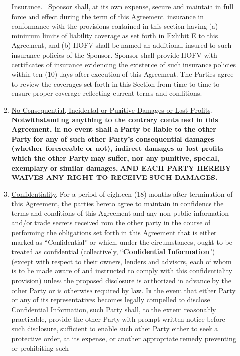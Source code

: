 \documentclass[]{article}
\begin{document}
\begin{enumerate}
\begin{enumerate}
    \uline{Insurance}.~ Sponsor shall, at its own expense, secure and
    maintain in full force and effect during the term of this
    Agreement~insurance in conformance with the provisions contained in
    this section having (a) minimum limits of liability coverage as set
    forth in \uline{Exhibit E} to this Agreement, and (b) HOFV shall be
    named an additional insured to such insurance policies of the
    Sponsor. Sponsor shall provide HOFV with certificates of insurance
    evidencing the existence of such insurance policies within ten (10)
    days after execution of this Agreement. The Parties agree to review
    the coverages set forth in this Section from time to time to ensure
    proper coverage reflecting current terms and conditions.
  \item
    \uline{No Consequential, Incidental or Punitive Damages or Lost
    Profits}. \textbf{Notwithstanding anything to the contrary contained
    in this Agreement, in no event shall a Party be liable to the other
    Party for any of such other Party's consequential damages (whether
    foreseeable or not), indirect damages or lost profits which the
    other Party may suffer, nor any punitive, special, exemplary or
    similar damages, AND EACH PARTY HEREBY WAIVES ANY RIGHT TO RECEIVE
    SUCH DAMAGES.}
  \item
    \uline{Confidentiality}. For a period of eighteen (18) months after
    termination of this Agreement, the parties hereto agree to maintain
    in confidence the terms and conditions of this Agreement and any
    non-public information and/or trade secrets received rom the other
    party in the course of performing the obligations set forth in this
    Agreement that is either marked as ``Confidential'' or which, under
    the circumstances, ought to be treated as confidential
    (collectively, ``\textbf{Confidential Information}'') (except with
    respect to their owners, lenders and advisors, each of whom is to be
    made aware of and instructed to comply with this confidentiality
    provision) unless the proposed disclosure is authorized in advance
    by the other Party or is otherwise required by law. In the event
    that either Party or any of its representatives becomes legally
    compelled to disclose Confidential Information, such Party shall, to
    the extent reasonably practicable, provide the other Party with
    prompt written notice before such disclosure, sufficient to enable
    such other Party either to seek a protective order, at its expense,
    or another appropriate remedy preventing or prohibiting such

\end{enumerate}
\end{enumerate}
\end{document}
